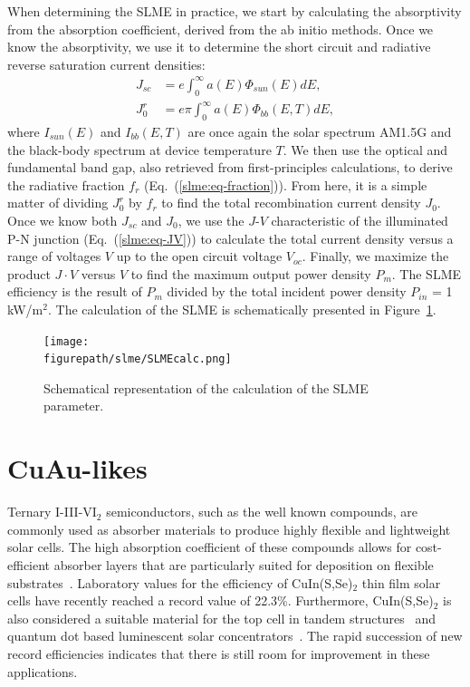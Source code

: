 \begin{refsection}
When determining the SLME in practice, we start by calculating the 
absorptivity from the absorption coefficient, derived from the ab initio 
methods. Once we know the absorptivity, we use it to determine the short 
circuit and radiative reverse saturation current densities: 
\begin{equation} \label{slme:eq-currents} 
\begin{aligned} 
J_{sc} &= e \int_0^\infty a(E)  \Phi_{sun} (E) dE, 
\\ J_0^r &= e\pi \int_0^\infty a(E)  \Phi_{bb} (E,T) dE, 
\end{aligned} 
\end{equation} 
where $I_{sun}(E)$ and $I_{bb}(E,T)$ are once again the solar spectrum AM1.5G  
and the black-body spectrum at device temperature $T$. We then use the optical 
and fundamental band gap, also retrieved from first-principles calculations, 
to derive the radiative fraction $f_r$ (Eq.~(\ref{slme:eq-fraction})). From 
here, it is a simple matter of dividing $J_0^r$ by $f_r$ to find the total 
recombination current density $J_0$. Once we know both $J_{sc}$ and $J_0$, we 
use the $J$-$V$ characteristic of the illuminated P-N junction 
(Eq.~(\ref{slme:eq-JV})) to calculate the total current density versus a range 
of voltages $V$ up to the open circuit voltage $V_{oc}$. Finally, we maximize 
the product $J\cdot V$ versus $V$ to find the maximum output power density 
$P_m$. The SLME efficiency is the result of $P_m$ divided by the total 
incident power density $P_{in}$ = 1 kW/m$^2$. The calculation of the SLME is 
schematically presented in Figure~\ref{slme:fig-SLMEcalc}. 
 
\begin{figure}[ht]  
\centering 
\texttt{[image: \\figurepath/slme/SLMEcalc.png]} 
\caption{Schematical representation of the calculation of the SLME parameter.} 
\label{slme:fig-SLMEcalc} 
\end{figure} 
 
\section{CuAu-likes} \label{slme:sec-CuAu} 
 
Ternary I-III-VI$_2$ semiconductors, such as the well known 
 compounds, are commonly used as absorber materials to 
produce highly flexible and lightweight solar cells. The high absorption 
coefficient of these compounds allows for cost-efficient absorber layers that 
are particularly suited for deposition on flexible 
substrates~\cite{Reinhard2013}. Laboratory values for the efficiency of 
CuIn(S,Se)$_2$ thin film solar cells have recently reached a record value of 
22.3\%. Furthermore, CuIn(S,Se)$_2$ is also considered a suitable material for 
the top cell in tandem structures~\cite{Cheek2013} and quantum dot based 
luminescent solar concentrators~\cite{Hu2015}. The rapid succession of new 
record efficiencies indicates that there is still room for improvement in 
these applications. 
 

\end{refsection}
